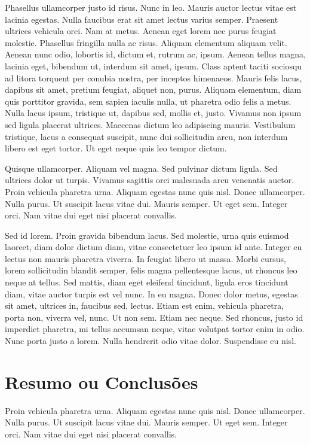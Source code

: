 Phasellus ullamcorper justo id risus. Nunc in leo. Mauris auctor
lectus vitae est lacinia egestas. Nulla faucibus erat sit amet lectus
varius semper. Praesent ultrices vehicula orci. Nam at metus. Aenean
eget lorem nec purus feugiat molestie. Phasellus fringilla nulla ac
risus. Aliquam elementum aliquam velit. Aenean nunc odio, lobortis id,
dictum et, rutrum ac, ipsum. Aenean tellus magna, lacinia eget,
bibendum ut, interdum sit amet, ipsum. Class aptent taciti sociosqu ad
litora torquent per conubia nostra, per inceptos himenaeos. Mauris
felis lacus, dapibus sit amet, pretium feugiat, aliquet non,
purus. Aliquam elementum, diam quis porttitor gravida, sem sapien
iaculis nulla, ut pharetra odio felis a metus. Nulla lacus ipsum,
tristique ut, dapibus sed, mollis et, justo. Vivamus non ipsum sed
ligula placerat ultrices. Maecenas dictum leo adipiscing
mauris. Vestibulum tristique, lacus a consequat suscipit, nunc dui
sollicitudin arcu, non interdum libero est eget tortor. Ut eget neque
quis leo tempor dictum. 

Quisque ullamcorper. Aliquam vel magna. Sed pulvinar dictum
ligula. Sed ultrices dolor ut turpis. Vivamus sagittis orci malesuada
arcu venenatis auctor. Proin vehicula pharetra urna. Aliquam egestas
nunc quis nisl. Donec ullamcorper. Nulla purus. Ut suscipit lacus
vitae dui. Mauris semper. Ut eget sem. Integer orci. Nam vitae dui
eget nisi placerat convallis. 

Sed id lorem. Proin gravida bibendum lacus. Sed molestie, urna quis
euismod laoreet, diam dolor dictum diam, vitae consectetuer leo ipsum
id ante. Integer eu lectus non mauris pharetra viverra. In feugiat
libero ut massa. Morbi cursus, lorem sollicitudin blandit semper,
felis magna pellentesque lacus, ut rhoncus leo neque at tellus. Sed
mattis, diam eget eleifend tincidunt, ligula eros tincidunt diam,
vitae auctor turpis est vel nunc. In eu magna. Donec dolor metus,
egestas sit amet, ultrices in, faucibus sed, lectus. Etiam est enim,
vehicula pharetra, porta non, viverra vel, nunc. Ut non sem. Etiam nec
neque. Sed rhoncus, justo id imperdiet pharetra, mi tellus accumsan
neque, vitae volutpat tortor enim in odio. Nunc porta justo a
lorem. Nulla hendrerit odio vitae dolor. Suspendisse eu nisl.  

\section{Resumo ou Conclusões}

Proin vehicula pharetra urna. Aliquam egestas
nunc quis nisl. Donec ullamcorper. Nulla purus. Ut suscipit lacus
vitae dui. Mauris semper. Ut eget sem. Integer orci. Nam vitae dui
eget nisi placerat convallis. 
